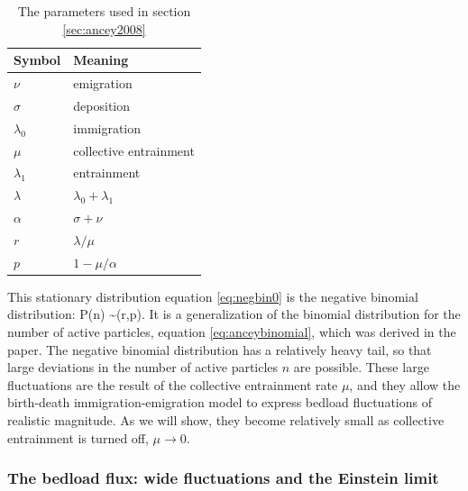 \begin{table}
\vspace{-10pt}
\caption{The parameters used in section \ref{sec:ancey2008}}\label{tab:symbols2008}
\begin{tabular}{p{3.3cm}p{3.3cm}}\\
\toprule  
Symbol & Meaning \\
\midrule
$\nu$ & emigration  \\  
$\sigma$ & deposition \\  
$\lambda_0$ & immigration  \\ 
$\mu$ & collective entrainment\\
$\lambda_1$ & entrainment\\ 
$\lambda$ &  $\lambda_0 + \lambda_1$ \\ 
$\alpha $& $\sigma+\nu$ \\
$r$ & $\lambda/\mu$ \\
$p$ & $1-\mu/\alpha$ \\
\bottomrule
\end{tabular}
\end{table} 

This stationary distribution equation \ref{eq:negbin0} is the negative binomial distribution: 
\be P(n) \sim {}(r,p).\label{eq:negbin}\ee
It is a generalization of the binomial distribution for the number of active particles, equation \ref{eq:anceybinomial}, which was derived in the \citet{Ancey2006} paper.
The negative binomial distribution has a relatively heavy tail, so that large deviations in the number of active particles $n$ are possible. 
These large fluctuations are the result of the collective entrainment rate $\mu$, and they allow the birth-death immigration-emigration model to express bedload fluctuations of realistic magnitude. 
As we will show, they become relatively small as collective entrainment is turned off, $\mu \rightarrow 0$. 

\subsubsection{The bedload flux: wide fluctuations and the Einstein limit}

